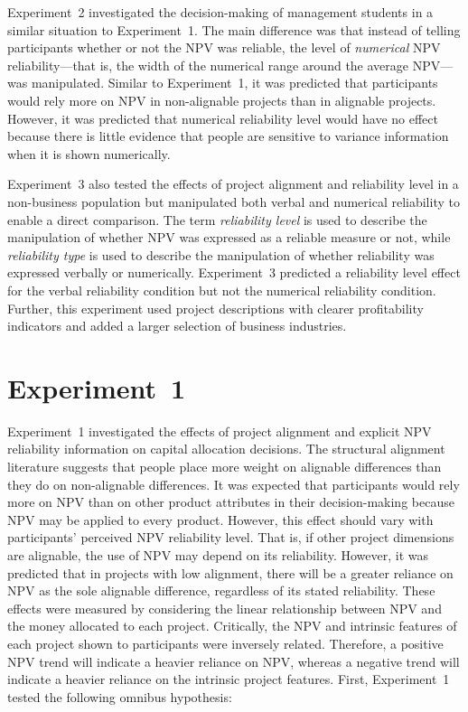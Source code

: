 \documentclass[a4paper, nobind]{templates/ociamthesis}
\theoremstyle{definition}
\theoremstyle{definition}
\theoremstyle{definition}
\theoremstyle{definition}
\theoremstyle{remark}
\begin{document}
Experiment~2 investigated the decision-making of management students in a
similar situation to Experiment~1. The main difference was that instead of
telling participants whether or not the NPV was reliable, the level of
\emph{numerical} NPV reliability---that is, the width of the numerical range around
the average NPV---was manipulated. Similar to Experiment~1, it was predicted
that participants would rely more on NPV in non-alignable projects than in
alignable projects. However, it was predicted that numerical reliability level
would have no effect because there is little evidence that people are sensitive
to variance information when it is shown numerically.

Experiment~3 also tested the effects of project alignment and reliability level
in a non-business population but manipulated both verbal and numerical
reliability to enable a direct comparison. The term \emph{reliability level} is used
to describe the manipulation of whether NPV was expressed as a reliable measure
or not, while \emph{reliability type} is used to describe the manipulation of whether
reliability was expressed verbally or numerically. Experiment~3 predicted a
reliability level effect for the verbal reliability condition but not the
numerical reliability condition. Further, this experiment used project
descriptions with clearer profitability indicators and added a larger selection
of business industries.

\hypertarget{alignment-2}{%
\section{Experiment~1}\label{alignment-2}}

Experiment~1 investigated the effects of project alignment and explicit NPV
reliability information on capital allocation decisions. The structural
alignment literature suggests that people place more weight on alignable
differences than they do on non-alignable differences. It was expected that
participants would rely more on NPV than on other product attributes in their
decision-making because NPV may be applied to every product. However, this
effect should vary with participants' perceived NPV reliability level. That is,
if other project dimensions are alignable, the use of NPV may depend on its
reliability. However, it was predicted that in projects with low alignment,
there will be a greater reliance on NPV as the sole alignable difference,
regardless of its stated reliability. These effects were measured by considering
the linear relationship between NPV and the money allocated to each project.
Critically, the NPV and intrinsic features of each project shown to participants
were inversely related. Therefore, a positive NPV trend will indicate a heavier
reliance on NPV, whereas a negative trend will indicate a heavier reliance on
the intrinsic project features. First, Experiment~1 tested the following omnibus
hypothesis:
\end{document}
